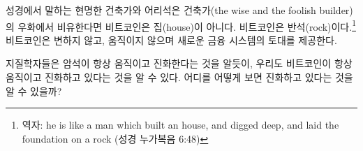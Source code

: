 \begin{comment}
	Arguably, in this parable of the wise and the foolish builders Bitcoin
	isn't the house. It is the rock. Unchangeable, unmoving, providing the
	foundation for a new financial system.
\end{comment}
성경에서 말하는 현명한 건축가와 어리석은 건축가(the wise and the foolish builder)의 우화에서 비유한다면
비트코인은 집(house)이 아니다. 비트코인은 반석(rock)이다.\footnote{역자: he is like a man which built an house, and digged deep, and laid the foundation on a rock (성경 누가복음 6:48)}
비트코인은 변하지 않고, 움직이지 않으며 새로운 금융 시스템의 토대를 제공한다.

\begin{comment}
	Just like geologists, who know that rock formations are always moving
	and evolving, one can see that Bitcoin is always moving and evolving as
	well. You just have to know where to look and how to look at it.
\end{comment}
지질학자들은 암석이 항상 움직이고 진화한다는 것을 알듯이,
우리도 비트코인이 항상 움직이고 진화하고 있다는 것을 알 수 있다.
어디를 어떻게 보면 진화하고 있다는 것을 알 수 있을까?
		
